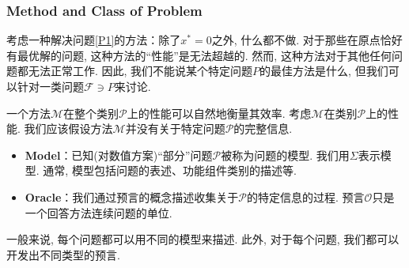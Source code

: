 \subsubsection{Method and Class of Problem}




考虑一种解决问题\ref{P1}的方法：除了$x^*=0$之外, 什么都不做. 对于那些在原点恰好有最优解的问题, 这种方法的``性能''是无法超越的. 然而, 这种方法对于其他任何问题都无法正常工作. 因此, 我们不能说某个特定问题$P$的最佳方法是什么, 但我们可以针对一类问题$\mathcal{F} \ni P$来讨论. 

一个方法$\mathcal{M}$在整个类别$\mathcal{P}$上的性能可以自然地衡量其效率. 考虑$\mathcal{M}$在类别$\mathcal{P}$上的性能. 我们应该假设方法$\mathcal{M}$并没有关于特定问题$\mathcal{P}$的完整信息. 

\begin{itemize}
    \item \textbf{Model}：已知(对数值方案)``部分''问题$\mathcal{P}$被称为问题的模型. 我们用$\Sigma$表示模型. 通常, 模型包括问题的表述、功能组件类别的描述等. 
    \item \textbf{Oracle}：我们通过预言的概念描述收集关于$\mathcal{P}$的特定信息的过程. 预言$\mathcal{O}$只是一个回答方法连续问题的单位. 
\end{itemize}
一般来说, 每个问题都可以用不同的模型来描述. 此外, 对于每个问题, 我们都可以开发出不同类型的预言. 

